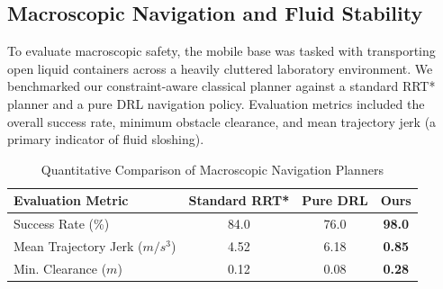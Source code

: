\documentclass[journal,twocolumn]{IEEEtran}
\begin{document}
\begin{table}[!t]
\caption{State synchronization targets and reported measured results}
\label{tab:sync_illustrative}
\centering
{}
\end{table}

\subsection{Macroscopic Navigation and Fluid Stability}
\label{subsec:exp_macro_benchmarks}

To evaluate macroscopic safety, the mobile base was tasked with transporting open liquid containers across a heavily cluttered laboratory environment. We benchmarked our constraint-aware classical planner against a standard RRT* planner and a pure DRL navigation policy. Evaluation metrics included the overall success rate, minimum obstacle clearance, and mean trajectory jerk (a primary indicator of fluid sloshing).

\begin{table}[!t]
\renewcommand{\arraystretch}{1.3}
\caption{Quantitative Comparison of Macroscopic Navigation Planners}
\label{tab:navigation_metrics}
\centering
\begin{tabular}{lccc}
\hline\hline
\textbf{Evaluation Metric} & \textbf{Standard RRT*} & \textbf{Pure DRL} & \textbf{Ours} \\ \hline
Success Rate (\%) & 84.0 & 76.0 & \textbf{98.0} \\
Mean Trajectory Jerk ($m/s^3$) & 4.52 & 6.18 & \textbf{0.85} \\
Min. Clearance ($m$) & 0.12 & 0.08 & \textbf{0.28} \\ \hline\hline
\end{tabular}
\end{table}
\end{document}
